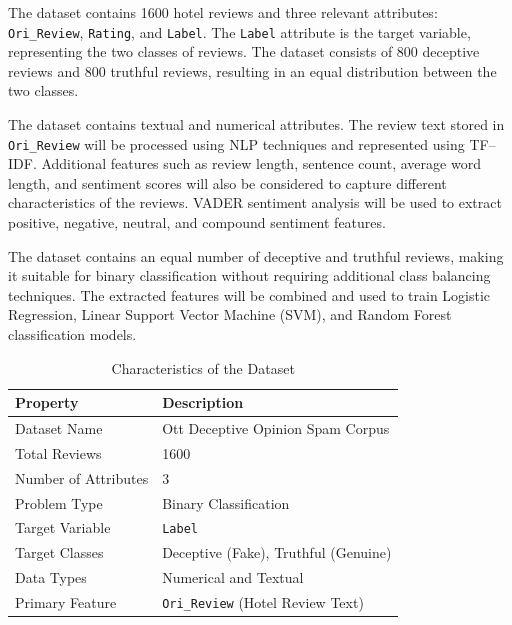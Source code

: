 \documentclass[12pt,a4paper]{report}
\begin{document}
The dataset contains 1600 hotel reviews and three relevant attributes: \texttt{Ori\_Review}, \texttt{Rating}, and \texttt{Label}. The \texttt{Label} attribute is the target variable, representing the two classes of reviews. The dataset consists of 800 deceptive reviews and 800 truthful reviews, resulting in an equal distribution between the two classes.

The dataset contains textual and numerical attributes. The review text stored in \texttt{Ori\_Review} will be processed using NLP techniques and represented using TF--IDF. Additional features such as review length, sentence count, average word length, and sentiment scores will also be considered to capture different characteristics of the reviews. VADER sentiment analysis will be used to extract positive, negative, neutral, and compound sentiment features.

The dataset contains an equal number of deceptive and truthful reviews, making it suitable for binary classification without requiring additional class balancing techniques. The extracted features will be combined and used to train Logistic Regression, Linear Support Vector Machine (SVM), and Random Forest classification models.

\begin{table}[H]
\centering
\small
\renewcommand{\arraystretch}{1.3}
\begin{tabularx}{0.95\textwidth}{|p{}|X|}
\hline
\textbf{Property} & \textbf{Description} \\
\hline
Dataset Name & Ott Deceptive Opinion Spam Corpus \\
\hline
Total Reviews & 1600 \\
\hline
Number of Attributes & 3 \\
\hline
Problem Type & Binary Classification \\
\hline
Target Variable & \texttt{Label} \\
\hline
Target Classes & Deceptive (Fake), Truthful (Genuine) \\
\hline
Data Types & Numerical and Textual \\
\hline
Primary Feature & \texttt{Ori\_Review} (Hotel Review Text) \\
\hline
\end{tabularx}
\caption{Characteristics of the Dataset}
\label{tab:datasetdescription}
\end{table}
\end{document}
